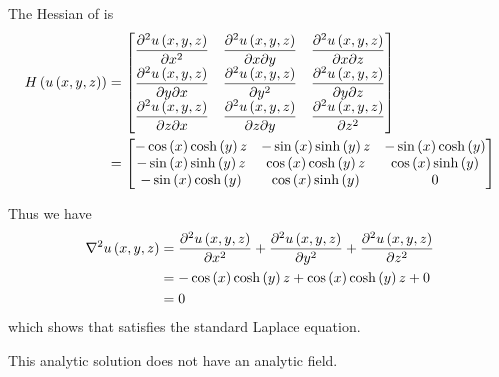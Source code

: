 The Hessian of  is
\begin{equation}
  \begin{aligned}
    \hessian{}{\fnof{u}{x,y,z}}&=\begin{bmatrix}
    \deltwosqby{\fnof{u}{x,y,z}}{x} & \deltwoby{\fnof{u}{x,y,z}}{x}{y} & \deltwoby{\fnof{u}{x,y,z}}{x}{z} \\
    \deltwoby{\fnof{u}{x,y,z}}{y}{x} & \deltwosqby{\fnof{u}{x,y,z}}{y} & \deltwoby{\fnof{u}{x,y,z}}{y}{z} \\
    \deltwoby{\fnof{u}{x,y,z}}{z}{x} & \deltwoby{\fnof{u}{x,y,z}}{z}{y} & \deltwosqby{\fnof{u}{x,y,z}}{z}
    \end{bmatrix}\\
    &=\begin{bmatrix}
    -\cosine{x}\hypecosine{y}z & -\sine{x}\hypesine{y}z & -\sine{x}\hypecosine{y} \\
    -\sine{x}\hypesine{y}z & \cosine{x}\hypecosine{y}z & \cosine{x}\hypesine{y} \\
    -\sine{x}\hypecosine{y} & \cosine{x}\hypesine{y} & 0 \\
    \end{bmatrix}
  \end{aligned}
  \label{eqn:StandardLaplaceThreeDAnalyticHessian2}
\end{equation}

Thus we have
\begin{equation}
  \begin{aligned}
    \laplacian{}{\fnof{u}{x,y,z}}&=\deltwosqby{\fnof{u}{x,y,z}}{x}+\deltwosqby{\fnof{u}{x,y,z}}{y}+\deltwosqby{\fnof{u}{x,y,z}}{z}\\
    &=-\cosine{x}\hypecosine{y}z+\cosine{x}\hypecosine{y}z+0\\
    &=0
  \end{aligned}
\end{equation}
which shows that  satisfies the standard Laplace equation.

This analytic solution does not have an analytic field.


